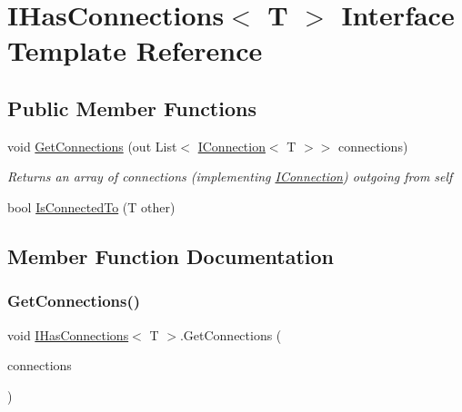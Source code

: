 \hypertarget{interface_i_has_connections}{}\section{I\+Has\+Connections$<$ T $>$ Interface Template Reference}
\label{interface_i_has_connections}
\subsection*{Public Member Functions}
\begin{DoxyCompactItemize}
\item 
void \mbox{\hyperlink{interface_i_has_connections_a10802404b8cf026d9755ef3c2c9ce075}{Get\+Connections}} (out List$<$ \mbox{\hyperlink{interface_i_connection}{I\+Connection}}$<$ T $>$$>$ connections)
\begin{DoxyCompactList}\small\item\em Returns an array of connections (implementing \mbox{\hyperlink{interface_i_connection}{I\+Connection}}) outgoing from self \end{DoxyCompactList}\item 
bool \mbox{\hyperlink{interface_i_has_connections_aaf582ecd5ed3d37d6a69b94fb947d9cb}{Is\+Connected\+To}} (T other)
\end{DoxyCompactItemize}


\subsection{Member Function Documentation}
\mbox{\label{interface_i_has_connections_a10802404b8cf026d9755ef3c2c9ce075}} 
\subsubsection{\texorpdfstring{Get\+Connections()}{GetConnections()}}
{\footnotesize\ttfamily void \mbox{\hyperlink{interface_i_has_connections}{I\+Has\+Connections}}$<$ T $>$.Get\+Connections (\begin{DoxyParamCaption}\item[{out List$<$ \mbox{\hyperlink{interface_i_connection}{I\+Connection}}$<$ T $>$$>$}]{connections }\end{DoxyParamCaption})}



